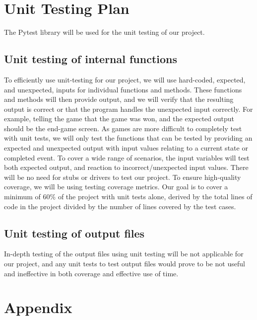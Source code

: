 \documentclass[12pt, titlepage]{article}
\begin{document}
\section{Unit Testing Plan}

The Pytest library will be used for the unit testing of our project.
		
\subsection{Unit testing of internal functions}

To efficiently use unit-testing for our project, we will use hard-coded, expected, and unexpected, inputs for individual functions and methods. These functions and methods will then provide output, and we will verify that the resulting output is correct or that the program handles the unexpected input correctly. For example, telling the game that the game was won, and the expected output should be the end-game screen. As games are more difficult to completely test with unit tests, we will only test the functions that can be tested by providing an expected and unexpected output with input values relating to a current state or completed event. To cover a wide range of scenarios, the input variables will test both expected output, and reaction to incorrect/unexpected input values. There will be no need for stubs or drivers to test our project. To ensure high-quality coverage, we will be using testing coverage metrics. Our goal is to cover a minimum of 60\% of the project with unit tests alone, derived by the total lines of code in the project divided by the number of lines covered by the test cases.
	
\subsection{Unit testing of output files}	

In-depth testing of the output files using unit testing will be not applicable for our project, and any unit tests to test output files would prove to be not useful and ineffective in both coverage and effective use of time.





\newpage

\section{Appendix}
\end{document}
